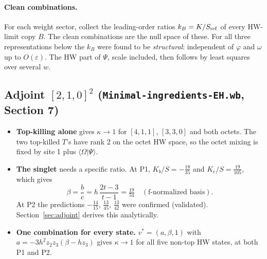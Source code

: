 \documentclass[11pt]{article}
\newcommand{\Om}{\Omega}
\newcommand{\eps}{\varepsilon}
\begin{document}
\paragraph{Clean combinations.} For each weight sector, collect the leading-order ratios $k_B=K/S_{\rm ref}$ of every HW-limit copy $B$. The clean combinations are the null space of these. For all three representations below the $k_B$ were found to be \emph{structural}: independent of $\varphi$ and $\omega$ up to $O(\eps)$. The HW part of $\Psi$, scale included, then follows by least squares over several $w$.

\subsection{Adjoint $[2,1,0]^2$ (\texttt{Minimal-ingredients-EH.wb}, Section 7)}
\begin{itemize}
\item \textbf{Top-killing alone} gives $\kappa\to1$ for $[4,1,1]$, $[3,3,0]$ and both octets. The two top-killed $T$'s have rank 2 on the octet HW space, so the octet mixing is fixed by site 1 plus $\langle\Om|\Psi\rangle$.
\item \textbf{The singlet} needs a specific ratio. At P1, $K_b/S=-\tfrac{18}{35}$ and $K_c/S=\tfrac{19}{105}$, which gives
\[
\beta=\frac{b}{c}=h\,\frac{2t-3}{t-1}=\tfrac{19}{54}\quad(\text{f-normalized basis}).
\]
At P2 the predictions $-\tfrac{14}{15}$, $\tfrac{13}{45}$, $\tfrac{13}{42}$ were confirmed (validated). Section~\ref{sec:adjoint} derives this analytically.
\item \textbf{One combination for every state.} $v^*=(a,\beta,1)$ with $a=-3h^2z_2z_3(\beta-hz_3)$ gives $\kappa\to1$ for all five non-top HW states, at both P1 and P2.
\end{itemize}
\end{document}
